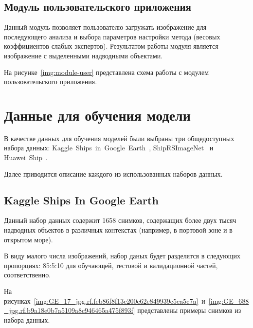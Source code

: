 \subsection*{Модуль пользовательского приложения}

Данный модуль позволяет пользователю загружать изображение для последующего анализа и выбора параметров настройки метода (весовых коэффициентов слабых экспертов). Результатом работы модуля является изображение с выделенными надводными объектами.

На рисунке~\ref{img:module-user} представлена схема работы с модулем пользовательского приложения.


\section{Данные для обучения модели}

В качестве данных для обучения моделей были выбраны три общедоступных набора данных: Kaggle~Ships~in~Google~Earth~\cite{kaggle-ships-in-google-earth-dfqwt_dataset}, ShipRSImageNet~\cite{shiprs-imagenet} и Huawei~Ship~\cite{huawei_ship_dataset}.

Далее приводится описание каждого из использованных наборов данных.

\subsection*{Kaggle Ships In Google Earth}

Данный набор данных содержит 1658 снимков, содержащих более двух тысяч надводных объектов в различных контекстах (например, в портовой зоне и в открытом море).

В виду малого числа изображений, набор даных будет разделятся в следующих пропорциях: 85:5:10 для обучающей, тестовой и валидационной частей, соответственно.

На рисунках~\ref{img:GE_17_jpg.rf.feb86f8f13e200e62e849939c5ea5c7a}~и~\ref{img:GE_688_jpg.rf.b9a18e0b7a5109a8c946465a475f893f} представлены примеры снимков из набора данных.




